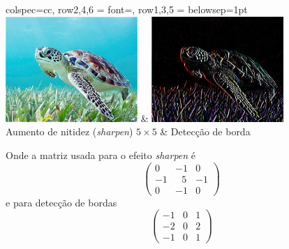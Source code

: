\documentclass[a4paper, 11pt]{article}
\begin{document}
\begin{center}
\begin{tblr}{
        colspec={cc},
        row{2,4,6} = {font=\tiny},
        row{1,3,5} = {belowsep=1pt}
        }
        \includegraphics[width=5cm]{figures/turtle_sharpen.png} & \includegraphics[width=5cm]{figures/turtle_edge.png} \\
        Aumento de nitidez (\textit{sharpen}) $5 \times 5$ &  Detecção de borda
    \end{tblr}
\end{center}

Onde a matriz usada para o efeito \textit{sharpen} é
\begin{equation}
    \begin{pmatrix}
        0 & -1 & 0\\
        -1 & \:\:\:5 & -1\\
        0 & -1 & 0
    \end{pmatrix}
\end{equation}
e para detecção de bordas
\begin{equation}
    \begin{pmatrix}
        -1 & 0 & 1\\
        -2 & 0 & 2\\
        -1 & 0 & 1
    \end{pmatrix}
\end{equation}
\end{document}
